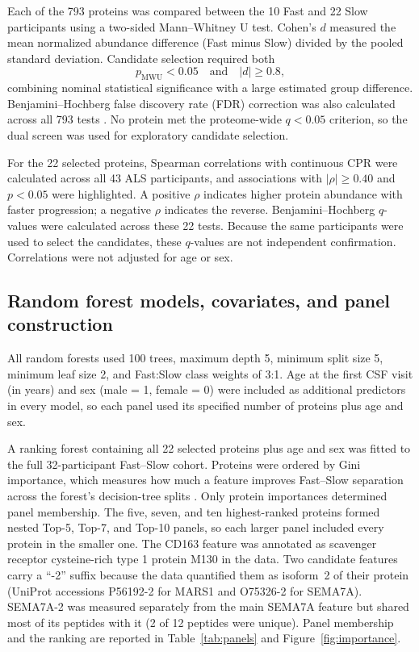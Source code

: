\documentclass[11pt,letterpaper]{article}
\begin{document}
Each of the 793 proteins was compared between the 10 Fast and 22 Slow participants using a two-sided Mann--Whitney U test. Cohen's $d$ measured the mean normalized abundance difference (Fast minus Slow) divided by the pooled standard deviation. Candidate selection required both
\[
p_{\text{MWU}} < 0.05 \quad \text{and} \quad |d| \geq 0.8,
\]
combining nominal statistical significance with a large estimated group difference. Benjamini--Hochberg false discovery rate (FDR) correction was also calculated across all 793 tests \citep{benjamini1995}. No protein met the proteome-wide $q < 0.05$ criterion, so the dual screen was used for exploratory candidate selection.

For the 22 selected proteins, Spearman correlations with continuous CPR were calculated across all 43 ALS participants, and associations with $|\rho| \geq 0.40$ and $p < 0.05$ were highlighted. A positive $\rho$ indicates higher protein abundance with faster progression; a negative $\rho$ indicates the reverse. Benjamini--Hochberg $q$-values were calculated across these 22 tests. Because the same participants were used to select the candidates, these $q$-values are not independent confirmation. Correlations were not adjusted for age or sex.

\subsection{Random forest models, covariates, and panel construction}

All random forests used 100 trees, maximum depth 5, minimum split size 5, minimum leaf size 2, and Fast:Slow class weights of 3:1. Age at the first CSF visit (in years) and sex (male = 1, female = 0) were included as additional predictors in every model, so each panel used its specified number of proteins plus age and sex.

A ranking forest containing all 22 selected proteins plus age and sex was fitted to the full 32-participant Fast--Slow cohort. Proteins were ordered by Gini importance, which measures how much a feature improves Fast--Slow separation across the forest's decision-tree splits \citep{breiman2001}. Only protein importances determined panel membership. The five, seven, and ten highest-ranked proteins formed nested Top-5, Top-7, and Top-10 panels, so each larger panel included every protein in the smaller one. The CD163 feature was annotated as scavenger receptor cysteine-rich type 1 protein M130 in the data. Two candidate features carry a ``-2'' suffix because the data quantified them as isoform~2 of their protein (UniProt accessions P56192-2 for MARS1 and O75326-2 for SEMA7A). SEMA7A-2 was measured separately from the main SEMA7A feature but shared most of its peptides with it (2 of 12 peptides were unique). Panel membership and the ranking are reported in Table~\ref{tab:panels} and Figure~\ref{fig:importance}.
\end{document}
